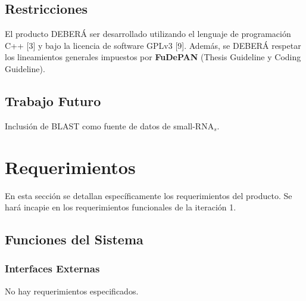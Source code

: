 \documentclass[12pt,a4paper,spanish]{article}
\begin{document}
\subsection{Restricciones}
	El producto DEBERÁ ser desarrollado utilizando el lenguaje de programación C++ [3] y bajo la licencia de software 		GPLv3 [9]. Además, se DEBERÁ respetar los lineamientos generales impuestos por \textbf{FuDePAN} (Thesis Guideline y Coding Guideline). 

\subsection{Trabajo Futuro}

Inclusión de BLAST como fuente de datos de small-RNA$_s$.

\section{Requerimientos}
\label{section-req} 
En esta sección se detallan específicamente los requerimientos del producto. Se hará incapie en los requerimientos funcionales de la iteración 1. 

\subsection{Funciones del Sistema}

	\subsubsection{Interfaces Externas}
		No hay requerimientos especificados.
		
\end{document}

